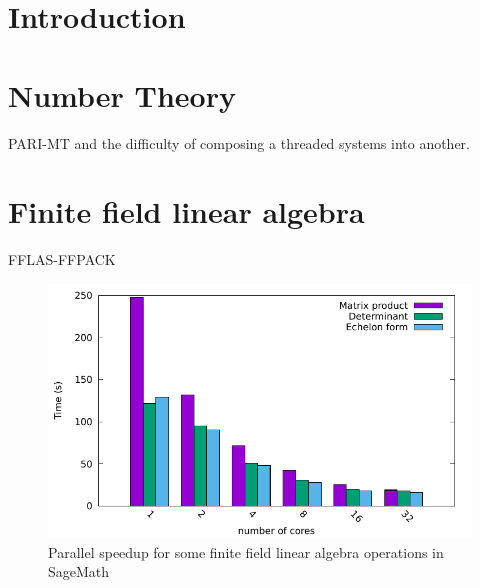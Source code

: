 \documentclass{deliverablereport}
\author{Author names}
\begin{document}
\maketitle
\githubissuedescription



\section{Introduction}

\section{Number Theory}

PARI-MT and the difficulty of composing a threaded systems into another.

\section{Finite field linear algebra}
FFLAS-FFPACK

\begin{figure}
  \begin{center}
    \includegraphics[width=.6\textwidth]{Pictures/histo_bigfoot3}
    \caption{Parallel speedup for some finite field linear algebra operations in SageMath}
  \end{center}
\end{figure}
\end{document}
